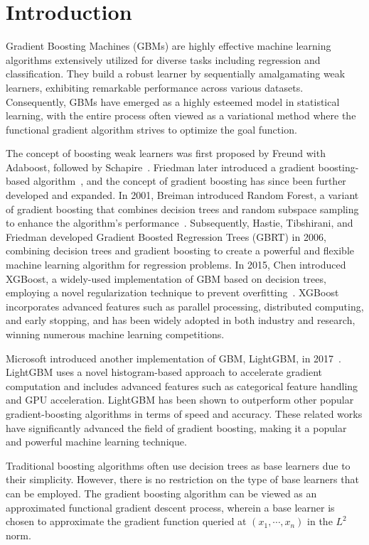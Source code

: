 \section{Introduction}
Gradient Boosting Machines (GBMs) are highly effective machine learning algorithms extensively utilized for diverse tasks including regression and classification. They build a robust learner by sequentially amalgamating weak learners, exhibiting remarkable performance across various datasets. Consequently, GBMs have emerged as a highly esteemed model in statistical learning, with the entire process often viewed as a variational method where the functional gradient algorithm strives to optimize the goal function.

The concept of boosting weak learners was first proposed by Freund with Adaboost, followed by Schapire~\cite{freund1996experiments}. Friedman later introduced a gradient boosting-based algorithm~\cite{friedman2001greedy}, and the concept of gradient boosting has since been further developed and expanded. In 2001, Breiman introduced Random Forest, a variant of gradient boosting that combines decision trees and random subspace sampling to enhance the algorithm's performance~\cite{breiman2001random}. Subsequently, Hastie, Tibshirani, and Friedman developed Gradient Boosted Regression Trees (GBRT) in 2006, combining decision trees and gradient boosting to create a powerful and flexible machine learning algorithm for regression problems. In 2015, Chen introduced XGBoost, a widely-used implementation of GBM based on decision trees, employing a novel regularization technique to prevent overfitting~\cite{chen2015xgboost}. XGBoost incorporates advanced features such as parallel processing, distributed computing, and early stopping, and has been widely adopted in both industry and research, winning numerous machine learning competitions.

Microsoft introduced another implementation of GBM, LightGBM, in 2017~\cite{ke2017lightgbm}. LightGBM uses a novel histogram-based approach to accelerate gradient computation and includes advanced features such as categorical feature handling and GPU acceleration. LightGBM has been shown to outperform other popular gradient-boosting algorithms in terms of speed and accuracy. These related works have significantly advanced the field of gradient boosting, making it a popular and powerful machine learning technique.

Traditional boosting algorithms often use decision trees as base learners due to their simplicity. However, there is no restriction on the type of base learners that can be employed. The gradient boosting algorithm can be viewed as an approximated functional gradient descent process, wherein a base learner is chosen to approximate the gradient function queried at $(x_1, \cdots, x_n)$ in the $L^2$ norm.

